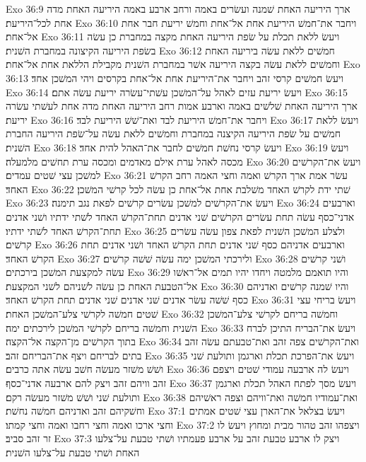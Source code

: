 Exo 36:9  ארך היריעה האחת שׁמנה ועשׂרים באמה ורחב ארבע באמה היריעה האחת מדה אחת לכל־היריעת׃
Exo 36:10  ויחבר את־חמשׁ היריעת אחת אל־אחת וחמשׁ יריעת חבר אחת אל־אחת׃
Exo 36:11  ויעשׂ ללאת תכלת על שׂפת היריעה האחת מקצה במחברת כן עשׂה בשׂפת היריעה הקיצונה במחברת השׁנית׃
Exo 36:12  חמשׁים ללאת עשׂה ביריעה האחת וחמשׁים ללאת עשׂה בקצה היריעה אשׁר במחברת השׁנית מקבילת הללאת אחת אל־אחת׃
Exo 36:13  ויעשׂ חמשׁים קרסי זהב ויחבר את־היריעת אחת אל־אחת בקרסים ויהי המשׁכן אחד׃
Exo 36:14  ויעשׂ יריעת עזים לאהל על־המשׁכן עשׁתי־עשׂרה יריעת עשׂה אתם׃
Exo 36:15  ארך היריעה האחת שׁלשׁים באמה וארבע אמות רחב היריעה האחת מדה אחת לעשׁתי עשׂרה יריעת׃
Exo 36:16  ויחבר את־חמשׁ היריעת לבד ואת־שׁשׁ היריעת לבד׃
Exo 36:17  ויעשׂ ללאת חמשׁים על שׂפת היריעה הקיצנה במחברת וחמשׁים ללאת עשׂה על־שׂפת היריעה החברת השׁנית׃
Exo 36:18  ויעשׂ קרסי נחשׁת חמשׁים לחבר את־האהל להית אחד׃
Exo 36:19  ויעשׂ מכסה לאהל ערת אילם מאדמים ומכסה ערת תחשׁים מלמעלה׃
Exo 36:20  ויעשׂ את־הקרשׁים למשׁכן עצי שׁטים עמדים׃
Exo 36:21  עשׂר אמת ארך הקרשׁ ואמה וחצי האמה רחב הקרשׁ האחד׃
Exo 36:22  שׁתי ידת לקרשׁ האחד משׁלבת אחת אל־אחת כן עשׂה לכל קרשׁי המשׁכן׃
Exo 36:23  ויעשׂ את־הקרשׁים למשׁכן עשׂרים קרשׁים לפאת נגב תימנה׃
Exo 36:24  וארבעים אדני־כסף עשׂה תחת עשׂרים הקרשׁים שׁני אדנים תחת־הקרשׁ האחד לשׁתי ידתיו ושׁני אדנים תחת־הקרשׁ האחד לשׁתי ידתיו׃
Exo 36:25  ולצלע המשׁכן השׁנית לפאת צפון עשׂה עשׂרים קרשׁים׃
Exo 36:26  וארבעים אדניהם כסף שׁני אדנים תחת הקרשׁ האחד ושׁני אדנים תחת הקרשׁ האחד׃
Exo 36:27  ולירכתי המשׁכן ימה עשׂה שׁשׁה קרשׁים׃
Exo 36:28  ושׁני קרשׁים עשׂה למקצעת המשׁכן בירכתים׃
Exo 36:29  והיו תואמם מלמטה ויחדו יהיו תמים אל־ראשׁו אל־הטבעת האחת כן עשׂה לשׁניהם לשׁני המקצעת׃
Exo 36:30  והיו שׁמנה קרשׁים ואדניהם כסף שׁשׁה עשׂר אדנים שׁני אדנים שׁני אדנים תחת הקרשׁ האחד׃
Exo 36:31  ויעשׂ בריחי עצי שׁטים חמשׁה לקרשׁי צלע־המשׁכן האחת׃
Exo 36:32  וחמשׁה בריחם לקרשׁי צלע־המשׁכן השׁנית וחמשׁה בריחם לקרשׁי המשׁכן לירכתים ימה׃
Exo 36:33  ויעשׂ את־הבריח התיכן לברח בתוך הקרשׁים מן־הקצה אל־הקצה׃
Exo 36:34  ואת־הקרשׁים צפה זהב ואת־טבעתם עשׂה זהב בתים לבריחם ויצף את־הבריחם זהב׃
Exo 36:35  ויעשׂ את־הפרכת תכלת וארגמן ותולעת שׁני ושׁשׁ משׁזר מעשׂה חשׁב עשׂה אתה כרבים׃
Exo 36:36  ויעשׂ לה ארבעה עמודי שׁטים ויצפם זהב וויהם זהב ויצק להם ארבעה אדני־כסף׃
Exo 36:37  ויעשׂ מסך לפתח האהל תכלת וארגמן ותולעת שׁני ושׁשׁ משׁזר מעשׂה רקם׃
Exo 36:38  ואת־עמודיו חמשׁה ואת־וויהם וצפה ראשׁיהם וחשׁקיהם זהב ואדניהם חמשׁה נחשׁת׃
Exo 37:1  ויעשׂ בצלאל את־הארן עצי שׁטים אמתים וחצי ארכו ואמה וחצי רחבו ואמה וחצי קמתו׃
Exo 37:2  ויצפהו זהב טהור מבית ומחוץ ויעשׂ לו זר זהב סביב׃
Exo 37:3  ויצק לו ארבע טבעת זהב על ארבע פעמתיו ושׁתי טבעת על־צלעו האחת ושׁתי טבעת על־צלעו השׁנית׃
